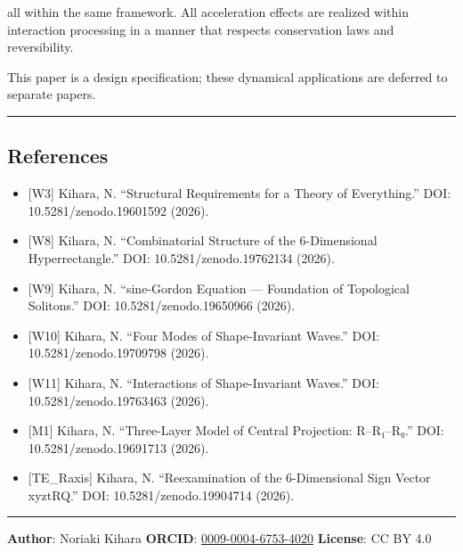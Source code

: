 \documentclass[a4paper,11pt]{article}
\providecommand{\tightlist}{\setlength{\itemsep}{0pt}\setlength{\parskip}{0pt}}
\begin{document}
all within the same framework. All acceleration effects are realized
within interaction processing in a manner that respects conservation
laws and reversibility.

This paper is a design specification; these dynamical applications are
deferred to separate papers.

\begin{center}\rule{0.5\linewidth}{0.5pt}\end{center}

\subsection{References}\label{references}

\begin{itemize}
\tightlist
\item
  {[}W3{]} Kihara, N. ``Structural Requirements for a Theory of
  Everything.'' DOI: 10.5281/zenodo.19601592 (2026).
\item
  {[}W8{]} Kihara, N. ``Combinatorial Structure of the 6-Dimensional
  Hyperrectangle.'' DOI: 10.5281/zenodo.19762134 (2026).
\item
  {[}W9{]} Kihara, N. ``sine-Gordon Equation --- Foundation of
  Topological Solitons.'' DOI: 10.5281/zenodo.19650966 (2026).
\item
  {[}W10{]} Kihara, N. ``Four Modes of Shape-Invariant Waves.'' DOI:
  10.5281/zenodo.19709798 (2026).
\item
  {[}W11{]} Kihara, N. ``Interactions of Shape-Invariant Waves.'' DOI:
  10.5281/zenodo.19763463 (2026).
\item
  {[}M1{]} Kihara, N. ``Three-Layer Model of Central Projection:
  R--R₁--R₀.'' DOI: 10.5281/zenodo.19691713 (2026).
\item
  {[}TE\_Raxis{]} Kihara, N. ``Reexamination of the 6-Dimensional Sign
  Vector xyztRQ.'' DOI: 10.5281/zenodo.19904714 (2026).
\end{itemize}

\begin{center}\rule{0.5\linewidth}{0.5pt}\end{center}

\textbf{Author}: Noriaki Kihara \textbf{ORCID}:
\href{https://orcid.org/0009-0004-6753-4020}{0009-0004-6753-4020}
\textbf{License}: CC BY 4.0
\end{document}
